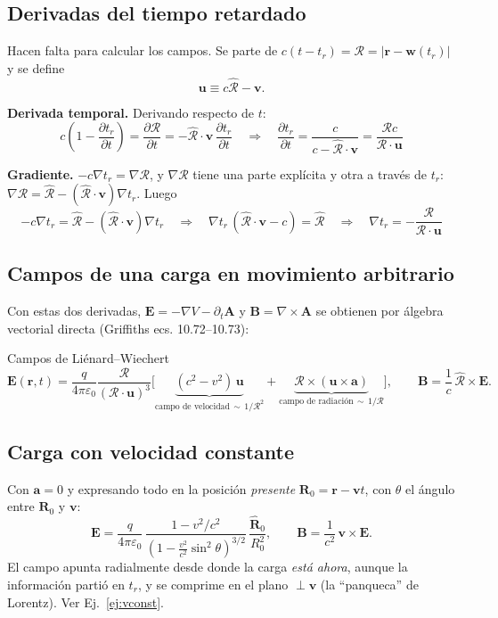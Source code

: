 \documentclass[11pt,a4paper]{article}
\newcommand{\Rv}{\bm{\mathcal R}}
\newcommand{\Rs}{\mathcal R}
\newcommand{\Rh}{\hat{\bm{\mathcal R}}}
\newcommand{\bv}{\mathbf v}
\newcommand{\av}{\mathbf a}
\newcommand{\uv}{\mathbf u}
\newcommand{\rr}{\mathbf r}
\theoremstyle{remark}
\begin{document}
\subsection{Derivadas del tiempo retardado}

Hacen falta para calcular los campos. Se parte de $c(t-t_r)=\Rs=|\rr-\mathbf w(t_r)|$ y se define
\begin{equation}
\uv\equiv c\Rh-\bv.
\end{equation}

\textbf{Derivada temporal.} Derivando respecto de $t$:
\[
c\left(1-\frac{\partial t_r}{\partial t}\right)=\frac{\partial\Rs}{\partial t}=-\Rh\cdot\bv\,\frac{\partial t_r}{\partial t}
\quad\Longrightarrow\quad
\boxed{\frac{\partial t_r}{\partial t}=\frac{c}{c-\Rh\cdot\bv}=\frac{\Rs c}{\Rv\cdot\uv}}
\]

\textbf{Gradiente.} $-c\nabla t_r=\nabla\Rs$, y $\nabla\Rs$ tiene una parte explícita y otra a través
de $t_r$: $\nabla\Rs=\Rh-(\Rh\cdot\bv)\nabla t_r$. Luego
\[
-c\nabla t_r=\Rh-(\Rh\cdot\bv)\nabla t_r
\quad\Longrightarrow\quad
\nabla t_r\,(\Rh\cdot\bv-c)=\Rh
\quad\Longrightarrow\quad
\boxed{\nabla t_r=-\frac{\Rv}{\Rv\cdot\uv}}
\]

\subsection{Campos de una carga en movimiento arbitrario}

Con estas dos derivadas, $\mathbf E=-\nabla V-\partial_t\mathbf A$ y $\mathbf B=\nabla\times\mathbf A$
se obtienen por álgebra vectorial directa (Griffiths ecs. 10.72--10.73):
\begin{resbox}{Campos de Liénard--Wiechert}
\begin{equation}
\mathbf E(\rr,t)=\frac{q}{4\pi\varepsilon_0}\frac{\Rs}{(\Rv\cdot\uv)^3}
\Big[\underbrace{(c^2-v^2)\,\uv}_{\text{campo de velocidad}\,\sim\,1/\Rs^2}
+\underbrace{\Rv\times(\uv\times\av)}_{\text{campo de radiación}\,\sim\,1/\Rs}\Big],
\qquad
\mathbf B=\frac1c\,\Rh\times\mathbf E.
\label{eq:LWfields}
\end{equation}
\end{resbox}

\subsection{Carga con velocidad constante}

Con $\av=0$ y expresando todo en la posición \emph{presente} $\mathbf R_0=\rr-\bv t$, con $\theta$ el
ángulo entre $\mathbf R_0$ y $\bv$:
\begin{equation}
\mathbf E=\frac{q}{4\pi\varepsilon_0}\,\frac{1-v^2/c^2}{\left(1-\frac{v^2}{c^2}\sin^2\theta\right)^{3/2}}\,\frac{\hat{\mathbf R}_0}{R_0^2},
\qquad \mathbf B=\frac1{c^2}\,\bv\times\mathbf E.
\end{equation}
El campo apunta radialmente desde donde la carga \emph{está ahora}, aunque la información partió en
$t_r$, y se comprime en el plano $\perp\bv$ (la ``panqueca'' de Lorentz). Ver Ej.~\ref{ej:vconst}.
\end{document}
